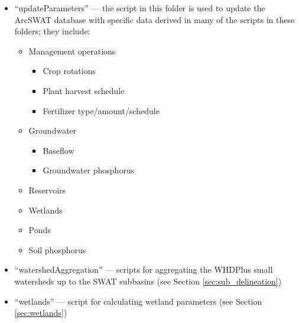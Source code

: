 \begin{itemize}
\item ``updateParameters'' --- the script in this folder is used to update the ArcSWAT database with specific data derived in many of the scripts in these folders; they include:
	\begin{itemize}
	\item Management operations
		\begin{itemize}
		\item Crop rotations 
		\item Plant harvest schedule
		\item Fertilizer type/amount/schedule
		\end{itemize}
	\item Groundwater
		\begin{itemize}
		\item Baseflow
		\item Groundwater phosphorus
		\end{itemize}
	\item Reservoirs
	\item Wetlands
	\item Ponds
	\item Soil phosphorus	
	\end{itemize} 

\item ``watershedAggregation'' --- scripts for aggregating the WHDPlus small watersheds up to the SWAT subbasins  (see Section \ref{sec:sub_delineation})

\item ``wetlands'' --- script for calculating wetland parameters  (see Section \ref{sec:wetlands})

\end{itemize}
